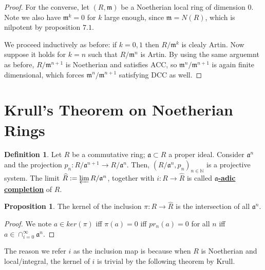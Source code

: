 \documentclass{article}
\theoremstyle{definition}
\theoremstyle{definition}
\theoremstyle{definition}
\newtheorem{proposition}{Proposition}[section]
\theoremstyle{definition}
\theoremstyle{definition}
\newtheorem{definition}{Definition}[section]
\theoremstyle{definition}
\theoremstyle{definition}
\begin{document}
\begin{proof}
    
    
   For the converse, let $(R,\mathfrak{m})$ be a Noetherian local ring of dimension $0$. Note we also have $\mathfrak{m}^k=0$ for $k$ large enough, since $\mathfrak{m}=N(R)$, which is nilpotent by proposition $7.1$. 
    
    We proceed inductively as before: if $k=0,1$ then $R/\mathfrak{m}^k$ is clealy Artin. Now suppose it holds for $k=n$ such that $R/ \mathfrak{m}^n$ is Artin. By using the same arguemnt as before, $R/\mathfrak{m}^{n+1}$ is Noetherian and satisfies ACC, so $\mathfrak{m}^n/\mathfrak{m}^{n+1}$ is again finite dimensional, which forces $\mathfrak{m}^n/\mathfrak{m}^{n+1}$ satisfying DCC as well. 
\end{proof}

\section{Krull's Theorem on Noetherian Rings}



\begin{tcolorbox}[colback=purple!5!white,colframe=purple!75!black]
\begin{definition}
    Let $R$ be a commutative ring; $\mathfrak{a}\subset R$ a proper ideal. Consider $\mathfrak{a}^n$ and the projection $p_n: R/\mathfrak{a}^{n+1}\to R/\mathfrak{a}^n$. Then, $(R/\mathfrak{a}^n, p_n)_{n\in \mathbb{N}}$ is a projective system. The limit $\widehat{R}:=\varprojlim R/\mathfrak{a}^n$, together with $i: R\to \widehat{R}$ is called $\mathfrak{a}$\underline{\textbf{-adic completion}} of $R$. 
\end{definition}
\end{tcolorbox}


\begin{tcolorbox}[colback=blue!5!white,colframe=blue!30!white]
\begin{proposition}
    The kernel of the inclusion $\pi: R\to \widehat{R}$ is the intersection of all $\mathfrak{a}^n$.

\end{proposition}
\end{tcolorbox}
\begin{proof}
    We note $a\in ker(\pi)$ iff $\pi(a)=0$ iff $pr_n(a)=0$ for all $n$ iff $a\in \cap_{i=0}^{\infty}\mathfrak{a}^n$. 
\end{proof}
The reason we refer $i$ as the inclusion map is because when $R$ is Noetherian and local/integral, the kernel of $i$ is trivial by the following theorem by Krull.
\end{document}
